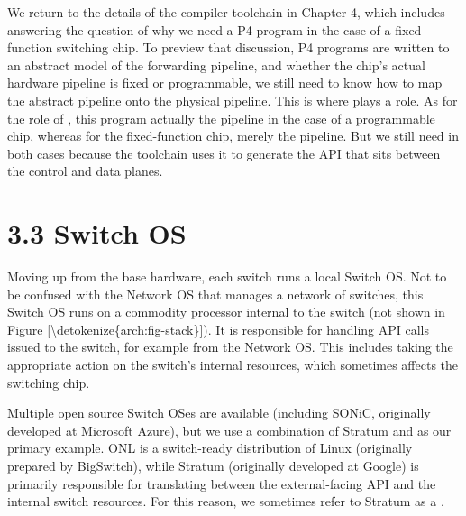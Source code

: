 \documentclass[letterpaper,11pt,english]{sphinxmanual}
\begin{document}
We return to the details of the compiler toolchain in Chapter 4, which
includes answering the question of why we need a P4 program in the
case of a fixed-function switching chip. To preview that discussion,
P4 programs are written to an abstract model of the forwarding
pipeline, and whether the chip’s actual hardware pipeline is fixed or
programmable, we still need to know how to map the abstract pipeline
onto the physical pipeline. This is where  plays a role. As
for the role of , this program actually  the
pipeline in the case of a programmable chip, whereas for the
fixed-function chip,  merely  the
pipeline. But we still need  in both cases because the
toolchain uses it to generate the API that sits between the control
and data planes.


\section{3.3 Switch OS}
\label{\detokenize{arch:switch-os}}
Moving up from the base hardware, each switch runs a local Switch
OS. Not to be confused with the Network OS that manages a network of
switches, this Switch OS runs on a commodity processor internal to
the switch (not shown in \hyperref[\detokenize{arch:fig-stack}]{Figure \ref{\detokenize{arch:fig-stack}}}). It is
responsible for handling API calls issued to the switch, for example
from the Network OS. This includes taking the appropriate action on
the switch’s internal resources, which sometimes affects the switching
chip.

Multiple open source Switch OSes are available (including SONiC,
originally developed at Microsoft Azure), but we use a combination of
Stratum and  as our primary example. ONL is
a switch-ready distribution of Linux (originally prepared by
BigSwitch), while Stratum (originally developed at Google) is
primarily responsible for translating between the external-facing API
and the internal switch resources. For this reason, we sometimes refer
to Stratum as a .
\end{document}
